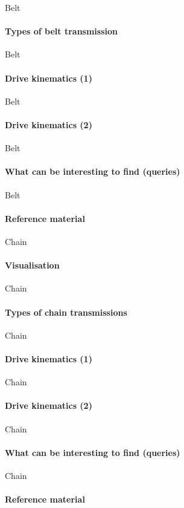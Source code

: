 \documentclass[aspectratio=169]{beamer}
\begin{document}
\begin{frame}[t]{Belt}
    \framesubtitle{Types of belt transmission}

\end{frame}

\begin{frame}[t]{Belt}
    \framesubtitle{Drive kinematics (1)}

\end{frame}

\begin{frame}[t]{Belt}
    \framesubtitle{Drive kinematics (2)}

\end{frame}

\begin{frame}[t]{Belt}
    \framesubtitle{What can be interesting to find (queries)}

\end{frame}

\begin{frame}[t]{Belt}
    \framesubtitle{Reference material}

\end{frame}

\begin{frame}[t]{Chain}
    \framesubtitle{Visualisation}

\end{frame}

\begin{frame}[t]{Chain}
    \framesubtitle{Types of chain transmissions}

\end{frame}

\begin{frame}[t]{Chain}
    \framesubtitle{Drive kinematics (1)}

\end{frame}

\begin{frame}[t]{Chain}
    \framesubtitle{Drive kinematics (2)}

\end{frame}

\begin{frame}[t]{Chain}
    \framesubtitle{What can be interesting to find (queries)}

\end{frame}

\begin{frame}[t]{Chain}
    \framesubtitle{Reference material}

\end{frame}
\end{document}
